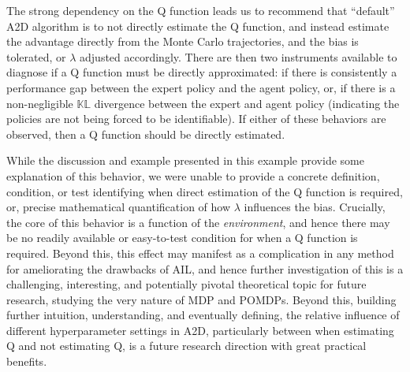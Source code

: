 The strong dependency on the Q function leads us to recommend that ``default'' A2D algorithm is to not directly estimate the Q function, and instead estimate the advantage directly from the Monte Carlo trajectories, and the bias is tolerated, or $\lambda$ adjusted accordingly.  There are then two instruments available to diagnose if a Q function must be directly approximated: if there is consistently a performance gap between the expert policy and the agent policy, or, if there is a non-negligible $\mathbb{KL}$ divergence between the expert and agent policy (indicating the policies are not being forced to be identifiable).  If either of these behaviors are observed, then a Q function should be directly estimated.  

While the discussion and example presented in this example provide some explanation of this behavior, we were unable to provide a concrete definition, condition, or test identifying when direct estimation of the Q function is required, or, precise mathematical quantification of how $\lambda$ influences the bias.  Crucially, the core of this behavior is a function of the \emph{environment}, and hence there may be no readily available or easy-to-test condition for when a Q function is required.  Beyond this, this effect may manifest as a complication in any method for ameliorating the drawbacks of AIL, and hence further investigation of this is a challenging, interesting, and potentially pivotal theoretical topic for future research, studying the very nature of MDP and POMDPs.  Beyond this, building further intuition, understanding, and eventually defining, the relative influence of different hyperparameter settings in A2D, particularly between when estimating Q and not estimating Q, is a future research direction with great practical benefits.  



